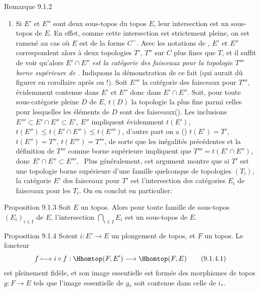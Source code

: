 \documentclass[10pt]{../fichiers-configuration-latex/smfart}
\begin{document}
\begin{enonce*}[remark]{Remarque 9.1.2}
\begin{enumerate}
\item Si $E'$ et $E''$ sont deux sous-topos du topos $E$, leur
intersection est un sous-topos de $E$. En effet, comme cette
intersection est strictement pleine, on est ramené au cas où $E$ est
de la forme $C^{\sim}$. Avec les notations de , $E'$ et $E''$
correspondent alors à deux topologies $T'$, $T''$ sur $C$ plus fines
que $T$, et il suffit de voir qu'alors $E'\cap E''$ \emph{est la
catégorie des faisceaux pour la topologie $T'''$ borne supérieure de
}. Indiquons la démonstration de ce fait (qui
aurait dû figurer en corollaire après  ou
 !). Soit $E'''$ la catégorie des faisceaux pour
$T'''$, évidemment contenue dans $E'$ et $E''$ donc dans $E'\cap
E''$. Soit, pour toute sous-catégorie pleine $D$ de $E$, $t(D)$ la
topologie la plus fine parmi celles pour lesquelles les éléments de
$D$ sont des faisceaux\pageoriginale (). Les
inclusions $E'''\subset E'\cap E''\subset E'$, $E''$ impliquent
évidemment $t(E')$, $t(E'')\leq t(E'\cap E'')\leq t(E''')$, d'autre
part on a () $t(E')=T'$, $t(E'')=T''$,
$t(E''')=T'''$, de sorte que les inégalités précédentes et la
définition de $T'''$ comme borne supérieure impliquent que
$T'''=t(E'\cap E'')$, donc $E'\cap E''\subset E'''$, \cqfd\  Plus
généralement, cet argument montre que si $T'$ est une topologie
borne supérieure d'une famille quelconque de topologies $(T_i)$, la
catégorie $E'$ des faisceaux pour $T'$ est l'intersection des
catégories $E_i$ de faisceaux pour les $T_i$. On en conclut en
particulier:
\end{enumerate}
\end{enonce*}

\begin{enonce*}[remark]{Proposition 9.1.3}
Soit $E$ un topos. Alors pour toute famille de sous-topos
$(E_i)_{i\in I}$ de $E$, l'intersection $\bigcap_{i\in I} E_i$ est
un sous-topos de $E$.
\end{enonce*}

\begin{enonce*}{Proposition 9.1.4}
Soient $i:E'\rightarrow E$ un plongement de topos, et $F$ un topos.
Le foncteur
\begin{equation*}
f\longmapsto i\circ f:\Hhomtop(F,E')\longrightarrow
\Hhomtop(F,E)\tag{9.1.4.1}
\end{equation*}
est pleinement fidèle, et son image essentielle est formée des
morphismes de topos $g:F\rightarrow E$ tels que l'image essentielle
de $g_{\ast}$ soit contenue dans celle de $i_{\ast}$.
\end{enonce*}
\end{document}
